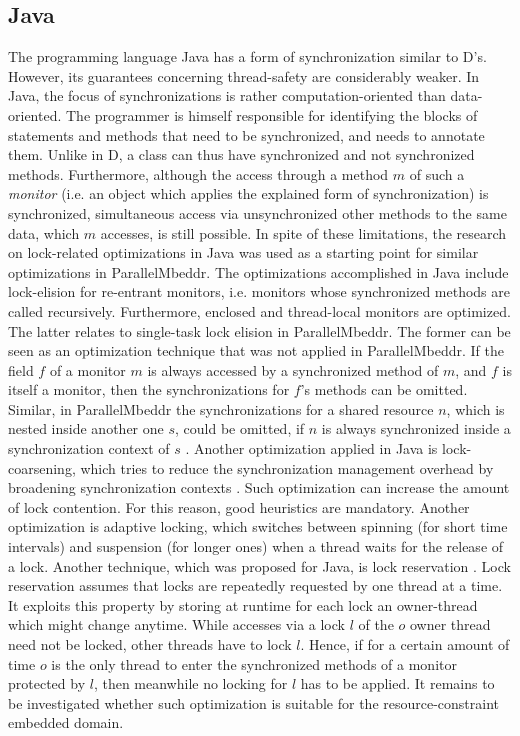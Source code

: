 \subsection{Java}
\label{java}
The programming language Java has a form of synchronization similar to D's. However, its guarantees concerning thread-safety are considerably weaker. In Java, the focus of synchronizations is rather computation-oriented than data-oriented. The programmer is himself responsible for identifying the blocks of statements and methods that need to be synchronized, and needs to annotate them. Unlike in D, a class can thus have synchronized and not synchronized methods. Furthermore, although the access through a method $m$ of such a \textit{monitor} (i.e. an object which applies the explained form of synchronization) is synchronized, simultaneous access via unsynchronized other methods to the same data, which $m$ accesses, is still possible. In spite of these limitations, the research on lock-related optimizations in Java was used as a starting point for similar optimizations in ParallelMbeddr. The optimizations accomplished in Java include lock-elision for re-entrant monitors, i.e. monitors whose synchronized methods are called recursively. Furthermore, enclosed and thread-local monitors are optimized. The latter relates to single-task lock elision in ParallelMbeddr. The former can be seen as an optimization technique that was not applied in ParallelMbeddr. If the field $f$ of a monitor $m$ is always accessed by a synchronized method of $m$, and $f$ is itself a monitor, then the synchronizations for $f$'s methods can be omitted. Similar, in ParallelMbeddr the synchronizations for a shared resource $n$, which is nested inside another one $s$, could be omitted, if $n$ is always synchronized inside a synchronization context of $s$ \cite{StaticAnalysesForJava}. Another optimization applied in Java is lock-coarsening, which tries to reduce the synchronization management overhead by broadening synchronization contexts \cite{JavaTheoryAndPractice}. Such optimization can increase the amount of lock contention. For this reason, good heuristics are mandatory. Another optimization is adaptive locking, which switches between spinning (for short time intervals) and suspension (for longer ones) when a thread waits for the release of a lock. Another technique, which was proposed for Java, is lock reservation \cite{LockReservation}. Lock reservation assumes that locks are repeatedly requested by one thread at a time. It exploits this property by storing at runtime for each lock an owner-thread which might change anytime. While accesses via a lock $l$ of the $o$ owner thread need not be locked, other threads have to lock $l$. Hence, if for a certain amount of time $o$ is the only thread to enter the synchronized methods of a monitor protected by $l$, then meanwhile no locking for $l$ has to be applied. It remains to be investigated whether such optimization is suitable for the resource-constraint embedded domain.

